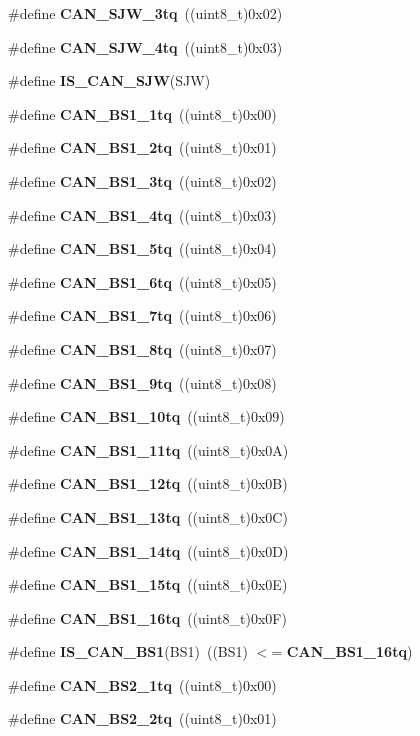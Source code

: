 \begin{DoxyCompactItemize}
\item 
\#define \textbf{ C\+A\+N\+\_\+\+S\+J\+W\+\_\+3tq}~((uint8\+\_\+t)0x02)
\item 
\#define \textbf{ C\+A\+N\+\_\+\+S\+J\+W\+\_\+4tq}~((uint8\+\_\+t)0x03)
\item 
\#define \textbf{ I\+S\+\_\+\+C\+A\+N\+\_\+\+S\+JW}(S\+JW)
\item 
\#define \textbf{ C\+A\+N\+\_\+\+B\+S1\+\_\+1tq}~((uint8\+\_\+t)0x00)
\item 
\#define \textbf{ C\+A\+N\+\_\+\+B\+S1\+\_\+2tq}~((uint8\+\_\+t)0x01)
\item 
\#define \textbf{ C\+A\+N\+\_\+\+B\+S1\+\_\+3tq}~((uint8\+\_\+t)0x02)
\item 
\#define \textbf{ C\+A\+N\+\_\+\+B\+S1\+\_\+4tq}~((uint8\+\_\+t)0x03)
\item 
\#define \textbf{ C\+A\+N\+\_\+\+B\+S1\+\_\+5tq}~((uint8\+\_\+t)0x04)
\item 
\#define \textbf{ C\+A\+N\+\_\+\+B\+S1\+\_\+6tq}~((uint8\+\_\+t)0x05)
\item 
\#define \textbf{ C\+A\+N\+\_\+\+B\+S1\+\_\+7tq}~((uint8\+\_\+t)0x06)
\item 
\#define \textbf{ C\+A\+N\+\_\+\+B\+S1\+\_\+8tq}~((uint8\+\_\+t)0x07)
\item 
\#define \textbf{ C\+A\+N\+\_\+\+B\+S1\+\_\+9tq}~((uint8\+\_\+t)0x08)
\item 
\#define \textbf{ C\+A\+N\+\_\+\+B\+S1\+\_\+10tq}~((uint8\+\_\+t)0x09)
\item 
\#define \textbf{ C\+A\+N\+\_\+\+B\+S1\+\_\+11tq}~((uint8\+\_\+t)0x0\+A)
\item 
\#define \textbf{ C\+A\+N\+\_\+\+B\+S1\+\_\+12tq}~((uint8\+\_\+t)0x0\+B)
\item 
\#define \textbf{ C\+A\+N\+\_\+\+B\+S1\+\_\+13tq}~((uint8\+\_\+t)0x0\+C)
\item 
\#define \textbf{ C\+A\+N\+\_\+\+B\+S1\+\_\+14tq}~((uint8\+\_\+t)0x0\+D)
\item 
\#define \textbf{ C\+A\+N\+\_\+\+B\+S1\+\_\+15tq}~((uint8\+\_\+t)0x0\+E)
\item 
\#define \textbf{ C\+A\+N\+\_\+\+B\+S1\+\_\+16tq}~((uint8\+\_\+t)0x0\+F)
\item 
\#define \textbf{ I\+S\+\_\+\+C\+A\+N\+\_\+\+B\+S1}(B\+S1)~((B\+S1) $<$= \textbf{ C\+A\+N\+\_\+\+B\+S1\+\_\+16tq})
\item 
\#define \textbf{ C\+A\+N\+\_\+\+B\+S2\+\_\+1tq}~((uint8\+\_\+t)0x00)
\item 
\#define \textbf{ C\+A\+N\+\_\+\+B\+S2\+\_\+2tq}~((uint8\+\_\+t)0x01)

\end{DoxyCompactItemize}

